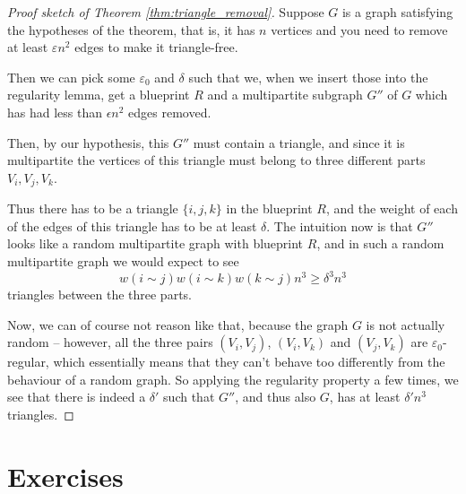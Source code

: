 \documentclass[nobib]{tufte-handout}
\begin{document}
\begin{proof}[Proof sketch of Theorem \ref{thm:triangle_removal}]
    Suppose $G$ is a graph satisfying the hypotheses of the theorem, that is, it has $n$ vertices and you need to remove at least $\varepsilon n^2$ edges to make it triangle-free.

    Then we can pick some $\varepsilon_0$ and $\delta$ such that we, when we insert those into the regularity lemma, get a blueprint $R$ and a multipartite subgraph $G''$ of $G$ which has had less than $\epsilon n^2$ edges removed.

    Then, by our hypothesis, this $G''$ must contain a triangle, and since it is multipartite the vertices of this triangle must belong to three different parts $V_i, V_j, V_k$.

    Thus there has to be a triangle $\{i, j, k\}$ in the blueprint $R$, and the weight of each of the edges of this triangle has to be at least $\delta$. The intuition now is that $G''$ looks like a random multipartite graph with blueprint $R$, and in such a random multipartite graph we would expect to see
    $$w(i\sim j)w(i\sim k)w(k\sim j)n^3 \geq \delta^3 n^3$$
    triangles between the three parts.

    Now, we can of course not reason like that, because the graph $G$ is not actually random -- however, all the three pairs $(V_i, V_j)$, $(V_i, V_k)$ and $(V_j, V_k)$ are $\varepsilon_0$-regular, which essentially means that they can't behave too differently from the behaviour of a random graph. So applying the regularity property a few times, we see that there is indeed a $\delta'$ such that $G''$, and thus also $G$, has at least $\delta' n^3$ triangles.
\end{proof}

\section{Exercises}


%
%
\end{document}
